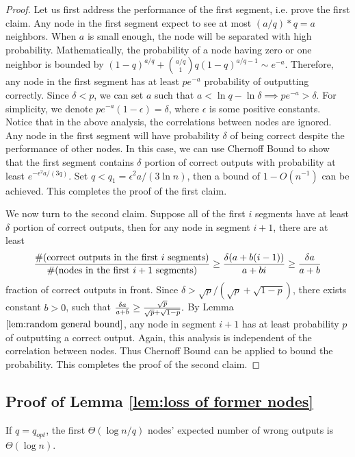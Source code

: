 \documentclass[a4paper,UKenglish]{lipics}
\theoremstyle{definition}
\begin{document}
\begin{proof}
Let us first address the performance of the first segment, i.e. prove the first claim.
Any node in the first segment expect to see at most $(a/q)*q = a$ neighbors.
When $a$ is small enough, the node will be separated with high probability.
Mathematically, the probability of a node having zero or one neighbor is bounded by
$
	(1-q)^{a/q} + {a/q \choose 1}q(1-q)^{a/q - 1} 
\sim
	e^{-a}.
$
Therefore, any node in the first segment has at least $pe^{-a}$ probability of outputting correctly.
Since $\delta < p$, we can set $a$ such that
$
	a < \ln q - \ln \delta 
	\implies 
	pe^{-a} > \delta.
$
For simplicity, we denote $pe^{-a}(1-\epsilon) = \delta$, where $\epsilon$ is some positive constants.
Notice that in the above analysis, the correlations between nodes are ignored.
Any node in the first segment will have probability $\delta$ of being correct despite the performance of other nodes.
In this case, we can use Chernoff Bound to show that the first segment 
	contains $\delta$ portion of correct outputs with probability at least $e^{-\epsilon^2a/(3q)}$.
Set $q < q_1 = \epsilon^2a / (3\ln n)$, then a bound of $1 - O(n^{-1})$ can be achieved. 
This completes the proof of the first claim.

We now turn to the second claim.
Suppose all of the first $i$ segments have at least $\delta$ portion of correct outputs,
	then for any node in segment $i+1$, there are at least 
\begin{equation*}
	{\#(\text{correct outputs in the first $i$ segments}) \over \#(\text{nodes in the first $i+1$ segments})}
\ge
	{\delta(a + b(i-1)) \over a + bi } 
\ge 
	{\delta a\over a + b}
\end{equation*}
fraction of correct outputs in front.
Since $\delta > \sqrt{p}/(\sqrt{p}+\sqrt{1-p})$, there exists constant $b > 0$, such that
$
	{\delta a\over a + b} 
\ge 
	{\sqrt{p}\over \sqrt{p}+\sqrt{1-p}}.
$
By Lemma $\ref{lem:random general bound}$, any node in segment $i+1$ has at least probability $p$ of outputting a correct output.
Again, this analysis is independent of the correlation between nodes.
Thus Chernoff Bound can be applied to bound the probability.
This completes the proof of the second claim.
\end{proof}



\subsection{Proof of Lemma \ref{lem:loss of former nodes}}
\label{subsec:loss of former nodes}
If $q = q_{opt}$, the first $\Theta(\log n/q)$ nodes' expected number of wrong outputs is $\Theta(\log n)$.
\end{document}
